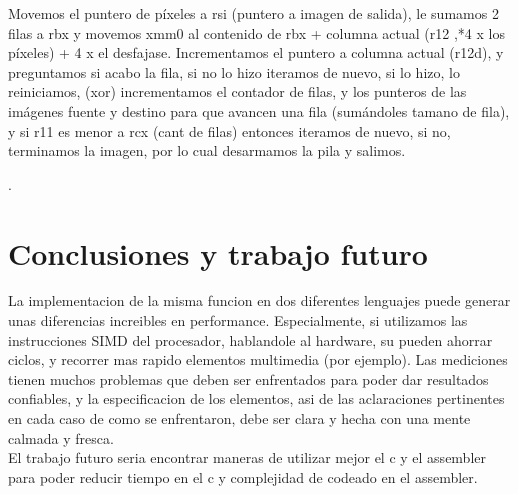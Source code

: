 \documentclass[a4paper]{article}
\begin{document}
  \hfill \break
  Movemos el puntero de píxeles a rsi (puntero a imagen de salida), le sumamos 2 filas a rbx y movemos xmm0 al contenido de rbx + columna actual (r12 ,*4 x los píxeles) + 4 x el desfajase. 
  \hfill \break
  Incrementamos el puntero a  columna actual (r12d), y preguntamos si acabo la fila, si no lo hizo iteramos de nuevo, si lo hizo, lo reiniciamos, (xor) incrementamos el contador de filas, y  los punteros de las imágenes fuente y destino para que avancen una fila (sumándoles tamano de fila), y si r11 es menor a rcx (cant de filas) entonces iteramos de nuevo, si no, terminamos la imagen, por lo cual desarmamos la pila y salimos. 
 \hfill \break
 

 







 
 

  
 

    
   
 
 
 
    	
	  
	
	 
	 
	
	
	   
		
	
	
	.
	
	
	
	
	 

	
	
	  



\section{Conclusiones y trabajo futuro}
\hfill \break
La implementacion de la misma funcion en dos diferentes lenguajes puede generar unas diferencias increibles en performance. Especialmente, si utilizamos las instrucciones SIMD del procesador, hablandole al hardware, su pueden ahorrar ciclos, y recorrer mas rapido elementos multimedia (por ejemplo).
Las mediciones tienen muchos problemas que deben ser enfrentados para poder dar resultados confiables, y la especificacion de los elementos, asi de las aclaraciones pertinentes en cada caso de como se enfrentaron,  debe ser clara y hecha con una mente calmada y fresca. 
\hfill \break
\\
El trabajo futuro seria encontrar maneras de utilizar mejor el c y el assembler para poder reducir tiempo en el c y complejidad de codeado en el assembler. 
\hfill \break
\end{document}
